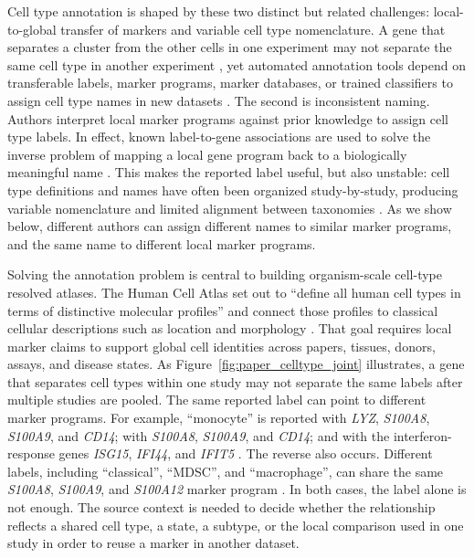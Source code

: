 \documentclass[10pt,twocolumn]{article}
\theoremstyle{plain}
\theoremstyle{definition}
\theoremstyle{remark}
\begin{document}
Cell type annotation is shaped by these two distinct but related challenges: local-to-global transfer of markers and variable cell type nomenclature. A gene that separates a cluster from the other cells in one experiment may not separate the same cell type in another experiment \citep{Krzak2026CrohnReplicability}, yet automated annotation tools depend on transferable labels, marker programs, marker databases, or trained classifiers to assign cell type names in new datasets \citep{Kiselev_2018,Aran_2019,Stuart_2019,Pliner2019Garnett,Zhang2019CellAssign,Ianevski_2022,Dominguez2022celltypist,Abdelaal2019CellIdentification}. The second is inconsistent naming. Authors interpret local marker programs against prior knowledge to assign cell type labels. In effect, known label-to-gene associations are used to solve the inverse problem of mapping a local gene program back to a biologically meaningful name \citep{Pliner2019Garnett,Zhang2019CellAssign,Ianevski_2022,Bi2026BinarySPA}. This makes the reported label useful, but also unstable: cell type definitions and names have often been organized study-by-study, producing variable nomenclature and limited alignment between taxonomies \citep{Miller2020CellNomenclature}. As we show below, different authors can assign different names to similar marker programs, and the same name to different local marker programs.



Solving the annotation problem is central to building organism-scale cell-type resolved atlases. The Human Cell Atlas set out to ``define all human cell types in terms of distinctive molecular profiles'' and connect those profiles to classical cellular descriptions such as location and morphology \citep{Regev2017HumanCellAtlas}. That goal requires local marker claims to support global cell identities across papers, tissues, donors, assays, and disease states. As Figure~\ref{fig:paper_celltype_joint} illustrates, a gene that separates cell types within one study may not separate the same labels after multiple studies are pooled. The same reported label can point to different marker programs. For example, ``monocyte'' is reported with \textit{LYZ}, \textit{S100A8}, \textit{S100A9}, and \textit{CD14}; with \textit{S100A8}, \textit{S100A9}, and \textit{CD14}; and with the interferon-response genes \textit{ISG15}, \textit{IFI44}, and \textit{IFIT5} \citep{Yang2019decontx,Yu2024hcnetlas,Rigby2023}. The reverse also occurs. Different labels, including ``classical'', ``MDSC'', and ``macrophage'', can share the same \textit{S100A8}, \textit{S100A9}, and \textit{S100A12} marker program \citep{Dominguez2022celltypist,Werba2023pdac,Pelka2021crc}. In both cases, the label alone is not enough. The source context is needed to decide whether the relationship reflects a shared cell type, a state, a subtype, or the local comparison used in one study in order to reuse a marker in another dataset.
\end{document}
